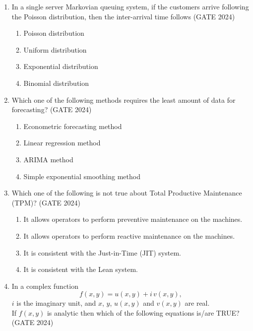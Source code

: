 \documentclass[journal,12pt,onecolumn]{IEEEtran}
\theoremstyle{remark}
\begin{document}
\begin{enumerate}
\item In a single server Markovian queuing system, if the customers arrive following the Poisson distribution, then the inter-arrival time follows
\hfill{(GATE 2024)}
\begin{multicols}{4}
\begin{enumerate}
    \item Poisson distribution
    \item Uniform distribution
    \item Exponential distribution
    \item Binomial distribution
\end{enumerate}
\end{multicols}
\vspace{1cm}

\item Which one of the following methods requires the least amount of data for forecasting?
\hfill{(GATE 2024)}
\begin{multicols}{4}
\begin{enumerate}
    \item Econometric forecasting method
    \item Linear regression method
    \item ARIMA method
    \item Simple exponential smoothing method
\end{enumerate}
\end{multicols}
\vspace{1cm}

\item Which one of the following is not true about Total Productive Maintenance (TPM)?
\hfill{(GATE 2024)}
\begin{multicols}{4}
\begin{enumerate}
    \item It allows operators to perform preventive maintenance on the machines.
    \item It allows operators to perform reactive maintenance on the machines.
    \item It is consistent with the Just-in-Time (JIT) system.
    \item It is consistent with the Lean system.
\end{enumerate}
\end{multicols}
\vspace{1cm}

\item In a complex function
\[
f(x,y) = u(x,y) + i\,v(x,y),
\]
$i$ is the imaginary unit, and $x$, $y$, $u(x,y)$ and $v(x,y)$ are real.\\
If $f(x,y)$ is analytic then which of the following equations is/are TRUE?
\hfill{(GATE 2024)}


\end{enumerate}
\end{document}

